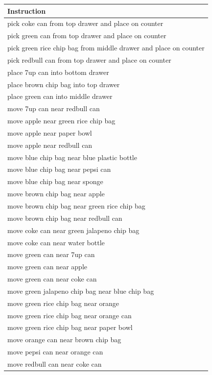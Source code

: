 \documentclass{article} %
\begin{document}
\begin{table}
\small
\begin{center}

\begin{tabular}{|p{}|}
\hline
\textbf{Instruction} \\ \hline
pick coke can from top drawer and place on counter \\
pick green can from top drawer and place on counter \\
pick green rice chip bag from middle drawer and place on counter \\
pick redbull can from top drawer and place on counter \\
place 7up can into bottom drawer \\
place brown chip bag into top drawer \\
place green can into middle drawer \\
move 7up can near redbull can \\
move apple near green rice chip bag \\
move apple near paper bowl \\
move apple near redbull can \\
move blue chip bag near blue plastic bottle \\
move blue chip bag near pepsi can \\
move blue chip bag near sponge \\
move brown chip bag near apple \\
move brown chip bag near green rice chip bag \\
move brown chip bag near redbull can \\
move coke can near green jalapeno chip bag \\
move coke can near water bottle \\
move green can near 7up can \\
move green can near apple \\
move green can near coke can \\
move green jalapeno chip bag near blue chip bag \\
move green rice chip bag near orange \\
move green rice chip bag near orange can \\
move green rice chip bag near paper bowl \\
move orange can near brown chip bag \\
move pepsi can near orange can \\
move redbull can near coke can \\

\end{tabular}
\end{center}
\end{table}
\end{document}
